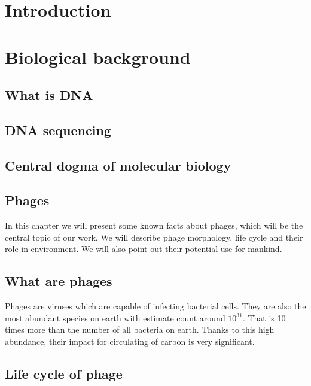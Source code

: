 \chapter{Introduction}

\chapter{Biological background}
\section{What is DNA}
\section{DNA sequencing}
\section{Central dogma of molecular biology}

\section{Phages}

In this chapter we will present some known facts about phages, which will be the central topic of our work. We will
describe phage morphology, life cycle and their role in environment. We will also point out their potential use for
mankind.

\section{What are phages}
Phages are viruses which are capable of infecting bacterial cells. They are also the most abundant species on earth
with estimate count around $10^{31}$. That is 10 times more than the number of all bacteria on earth. Thanks to this
high abundance, their impact for circulating of carbon is very significant.
\section{Life cycle of phage}
